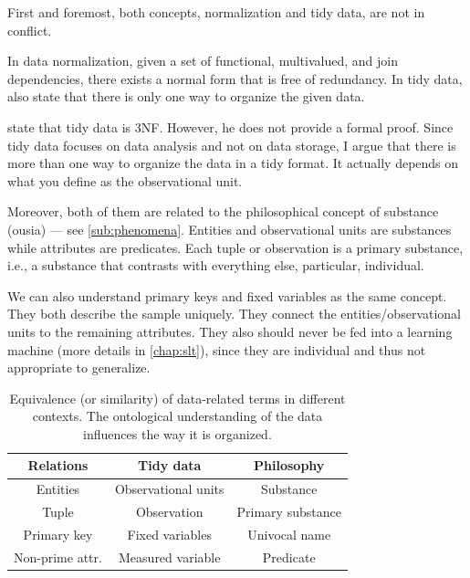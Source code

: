 First and foremost, both concepts, normalization and tidy data, are not in conflict.

In data normalization, given a set of functional, multivalued, and join dependencies, there
exists a normal form that is free of redundancy.  In tidy data,
\textcite{Wickham2023} also state that there is only one way to organize the given data.

\textcite{Wickham2014} state that tidy data is 3NF.  However, he does not provide a
formal proof.  Since tidy data focuses on data analysis and not on data storage, I argue
that there is more than one way to organize the data in a tidy format.  It actually
depends on what you define as the observational unit.

Moreover, both of them are related to the philosophical concept of substance (ousia) ---
see \cref{sub:phenomena}.
Entities and observational units are substances while attributes are predicates.
Each tuple or observation is a primary substance, i.e., a substance that contrasts with
everything else, particular, individual.

We can also understand primary keys and fixed variables as the same concept.  They both
describe the sample uniquely.  They connect the entities/observational
units to the remaining attributes.  They also should never be fed into a learning
machine (more details in \cref{chap:slt}), since they are individual and thus not
appropriate to generalize.

\begin{table}
  \centering
  \begin{tabular}{ccc}
    \toprule
    \textbf{Relations} & \textbf{Tidy data} & \textbf{Philosophy} \\
    \midrule
    Entities & Observational units & Substance \\
    Tuple & Observation & Primary substance \\
    Primary key & Fixed variables & Univocal name \\
    Non-prime attr. & Measured variable & Predicate \\
    \bottomrule
  \end{tabular}
  \caption{
  Equivalence (or similarity) of data-related terms in different contexts.
  The ontological understanding of the data influences the way it is organized.
  }
  \label{fig:bridge}
\end{table}

